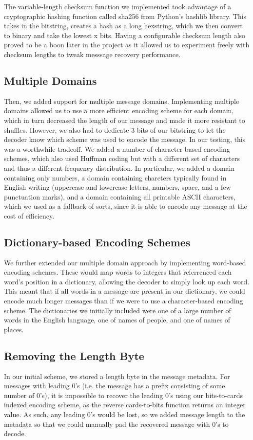 \documentclass[titlepage]{article}
\begin{document}
The variable-length checksum function we implemented took advantage of a cryptographic hashing function called sha256 from Python's hashlib library. This takes in the bitstring, creates a hash as a long hexstring, which we then convert to binary and take the lowest x bits. Having a configurable checksum length also proved to be a boon later in the project as it allowed us to experiment freely with checksum lengths to tweak messsage recovery performance.

\subsection{Multiple Domains}
Then, we added support for multiple message domains. Implementing multiple domains allowed us to use a more efficient encoding scheme for each domain, which in turn decreased the length of our message and made it more resistant to shuffles. However, we also had to dedicate 3 bits of our bitstring to let the decoder know which scheme was used to encode the message. In our testing, this was a worthwhile tradeoff. We added a number of character-based encoding schemes, which also used Huffman coding but with a different set of characters and thus a different frequency distribution. In particular, we added a domain containing only numbers, a domain containing charcters typically found in English writing (uppercase and lowercase letters, numbers, space, and a few punctuation marks), and a domain containing all printable ASCII characters, which we used as a fallback of sorts, since it is able to encode any message at the cost of efficiency.

\subsection{Dictionary-based Encoding Schemes}
We further extended our multiple domain approach by implementing word-based encoding schemes. These would map words to integers that referrenced each word's position in a dictionary, allowing the decoder to simply look up each word. This meant that if all words in a message are present in our dictionary, we could encode much longer messages than if we were to use a character-based encoding scheme. The dictionaries we initially included were one of a large number of words in the English language, one of names of people, and one of names of places.

\subsection{Removing the Length Byte} \label{no_length_byte}
In our initial scheme, we stored a length byte in the message metadata. For messages with leading 0's (i.e. the message has a prefix consisting of some number of 0's), it is impossible to recover the leading 0's using our bits-to-cards indexed encoding scheme, as the reverse cards-to-bits function returns an integer value. As such, any leading 0's would be lost, so we added message length to the metadata so that we could manually pad the recovered message with 0's to decode.
\end{document}
